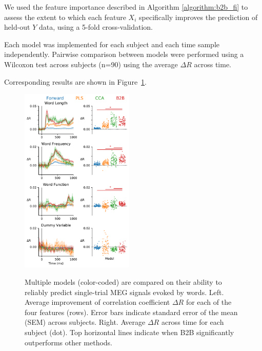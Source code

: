 We used the feature importance described in Algorithm \ref{algorithm:b2b_fi} to assess the extent to which each feature $X_i$ specifically improves the prediction of held-out $Y$ data, using a 5-fold cross-validation.

Each model was implemented for each subject and each time sample independently. Pairwise comparison between models were performed using a Wilcoxon test across subjects (n=90) using the average $\Delta R$ across time.

Corresponding results are shown in Figure~\ref{fig:meg_results}.



\begin{figure}
  \vspace{-12ex}
  \begin{center}
    \includegraphics[width=0.48\textwidth, trim=0cm 0cm 0cm 0cm, clip=True]{figures/meg.pdf}

    \label{fig:meg_results}
  \end{center}
  \caption{Multiple models (color-coded) are compared on their ability to reliably predict single-trial MEG signals evoked by words. Left. Average improvement of correlation coefficient $\Delta R$ for each of the four features (rows). Error bars indicate standard error of the mean (SEM) across subjects. Right. Average $\Delta R$ across time for each subject (dot). Top horizontal lines indicate when B2B significantly outperforms other methods.}
  \vspace{-9ex}
\end{figure}


